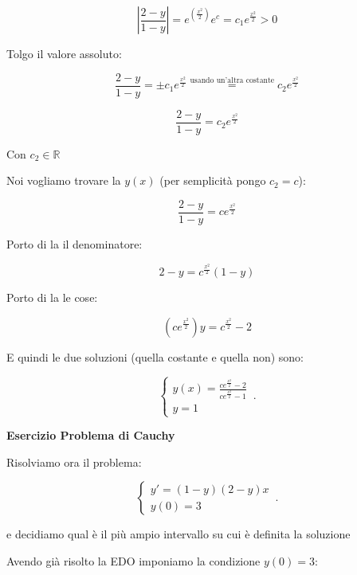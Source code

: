 \documentclass[../appunti-analisi.tex]{subfiles}
\begin{document}
\begin{enumerate}
        \[
            |\frac{2-y}{1-y} | = e^{(\frac{x ^{2}}{2})} e ^{c} = c_1 e ^{\frac{x ^{2}}{2} } >0
        \]

        Tolgo il valore assoluto:

        \[
            \frac{2-y}{1-y} = \pm c_1 e ^{\frac{x ^{2}}{2} }\overset{\text{usando un'altra costante}}{=}c_2 e ^{\frac{x ^{2}}{2} }
        \]

        \[
            \frac{2-y}{1-y} = c_2 e ^{\frac{x ^{2}}{2} }
        \]

        Con $c_2 \in \mathbb{R}$

        Noi vogliamo trovare la $y(x)$ (per semplicità pongo $c_2 = c$):

        \[
            \frac{2-y}{1-y} = c e ^{\frac{x ^{2}}{2} }
        \]

        Porto di la il denominatore:

        \[
            2-y = c ^{\frac{x ^{2}}{2} } (1-y)
        \]

        Porto di la le cose:

        \[
            (c e ^{\frac{x ^{2}}{2} })y = c ^{\frac{x ^{2}}{2} }-2
        \]

        E quindi le due soluzioni (quella costante e quella non) sono:

        \begin{equation}
            \begin{cases}
            y(x) = \frac{c e ^{\frac{x ^{2}}{2} }-2}{c e ^{\frac{x ^{2}}{2} }-1}   \\
            y=1
            \end{cases}\,.
        \end{equation}

\end{enumerate}

\textbf{Esercizio Problema di Cauchy}

Risolviamo ora il problema:

\begin{equation}
    \begin{cases}
      y'=(1-y)(2-y)x\\
      y(0)=3
    \end{cases}\,.
\end{equation}

e decidiamo qual è il più ampio intervallo su cui è definita la soluzione

Avendo già risolto la EDO imponiamo la condizione $y(0) = 3$:
\end{document}
